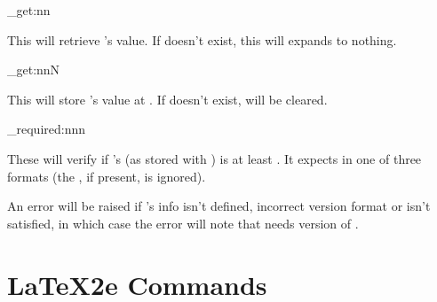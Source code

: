 \documentclass[10pt]{article}
\begin{document}

\begin{codedescribe}{\pkginfo_get:nn}
\begin{codesyntax}%
\end{codesyntax}
This will retrieve 's value. If  doesn't exist, this will expands to nothing.
\end{codedescribe}

\begin{codedescribe}{\pkginfo_get:nnN}
\begin{codesyntax}%
\end{codesyntax}
This will store 's value at . If  doesn't exist,  will be cleared.
\end{codedescribe}

\begin{codedescribe}{\pkginfo_required:nnn}
\begin{codesyntax}%
\end{codesyntax}
These will verify if 's  (as stored with ) is at least . It expects  in one of three formats  (the \tsobj[key]{[v]}, if present, is ignored).
\end{codedescribe}
\begin{tsremark}
  An error will be raised if 's info isn't defined, incorrect version format or  isn't satisfied, in which case the error will note that  needs version  of .
\end{tsremark}


\section{LaTeX2e Commands}\label{2e-cmds}
\end{document}
